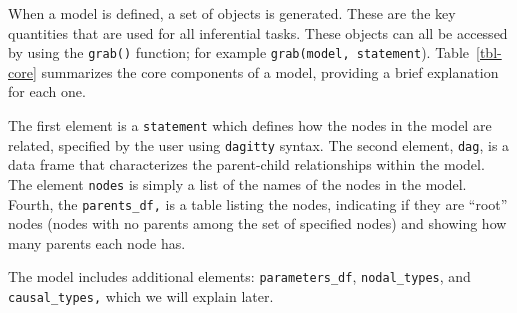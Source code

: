 \documentclass[
  11pt,
  article]{jss}
\begin{document}
When a model is defined, a set of objects is generated. These are the
key quantities that are used for all inferential tasks. These objects
can all be accessed by using the \texttt{grab()} function; for example
\texttt{grab(model,\ statement}). Table~\ref{tbl-core} summarizes the
core components of a model, providing a brief explanation for each one.

The first element is a \texttt{statement} which defines how the nodes in
the model are related, specified by the user using \texttt{dagitty}
syntax. The second element, \texttt{dag}, is a data frame that
characterizes the parent-child relationships within the model. The
element \texttt{nodes} is simply a list of the names of the nodes in the
model. Fourth, the \texttt{parents\_df,} is a table listing the nodes,
indicating if they are ``root'' nodes (nodes with no parents among the
set of specified nodes) and showing how many parents each node has.

The model includes additional elements: \texttt{parameters\_df},
\texttt{nodal\_types}, and \texttt{causal\_types,} which we will explain
later.
\end{document}
